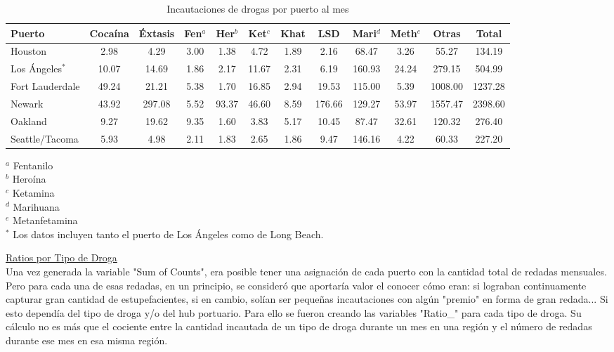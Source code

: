 \documentclass[12pt]{article}
\begin{document}
		\begingroup
		\small
		\begin{table}[H]
			\begin{center}
				\caption{Incautaciones de drogas por puerto al mes}
				\label{tabla_incautaciones}
				\setlength{\tabcolsep}{1pt}
				\begin{tabular}{|l|c|c|c|c|c|c|c|c|c|c|c|}
					\hline
					\textbf{Puerto} & \textbf{Cocaína} & \textbf{Éxtasis} & \textbf{Fen$^a$} & \textbf{Her$^b$} & \textbf{Ket$^c$} & \textbf{Khat} & \textbf{LSD} & \textbf{Mari$^d$} & \textbf{Meth$^e$} & \textbf{Otras} & \textbf{Total} \\
					\hline
					Houston & 2.98 & 4.29 & 3.00 & 1.38 & 4.72 & 1.89 & 2.16 & 68.47 & 3.26 & 55.27 & 134.19 \\
					Los Ángeles$^*$ & 10.07 & 14.69 & 1.86 & 2.17 & 11.67 & 2.31 & 6.19 & 160.93 & 24.24 & 279.15 & 504.99 \\
					Fort Lauderdale & 49.24 & 21.21 & 5.38 & 1.70 & 16.85 & 2.94 & 19.53 & 115.00 & 5.39 & 1008.00 & 1237.28 \\
					Newark & 43.92 & 297.08 & 5.52 & 93.37 & 46.60 & 8.59 & 176.66 & 129.27 & 53.97 & 1557.47 & 2398.60 \\
					Oakland & 9.27 & 19.62 & 9.35 & 1.60 & 3.83 & 5.17 & 10.45 & 87.47 & 32.61 & 120.32 & 276.40 \\
					Seattle/Tacoma & 5.93 & 4.98 & 2.11 & 1.83 & 2.65 & 1.86 & 9.47 & 146.16 & 4.22 & 60.33 & 227.20 \\
					\hline
				\end{tabular}
			\end{center}
			$^a$ Fentanilo \\
			$^b$ Heroína \\
			$^c$ Ketamina \\ 
			$^d$ Marihuana \\
			$^e$ Metanfetamina \\
			$^*$ Los datos incluyen tanto el puerto de Los Ángeles como de Long Beach.
		\end{table}
		\endgroup
		
		\underline{Ratios por Tipo de Droga}\\
		Una vez generada la variable "Sum of Counts", era posible tener una asignación de cada puerto con la cantidad total de redadas mensuales. Pero para cada una de esas redadas, en un principio, se consideró que aportaría valor el conocer cómo eran: si lograban continuamente capturar gran cantidad de estupefacientes, si en cambio, solían ser pequeñas incautaciones con algún "premio" en forma de gran redada... Si esto dependía del tipo de droga y/o del hub portuario. Para ello se fueron creando las variables "Ratio\_" para cada tipo de droga. Su cálculo no es más que el cociente entre la cantidad incautada de un tipo de droga durante un mes en una región y el número de redadas durante ese mes en esa misma región.
		
\end{document}
